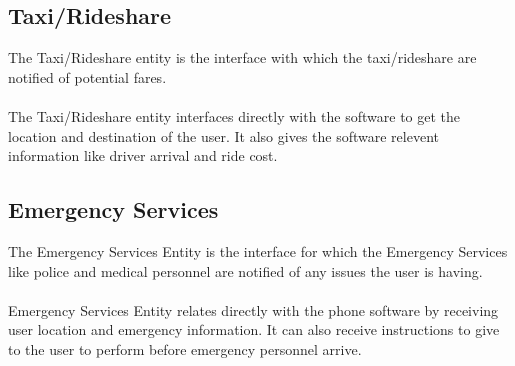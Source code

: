 \documentclass[12pt]{article}
\begin{document}
\begin{multicols}{2}
\subsection*{Taxi/Rideshare}
The Taxi/Rideshare entity is the interface with which the taxi/rideshare are notified of potential fares.\\
\\
The Taxi/Rideshare entity interfaces directly with the software to get the location and destination of the user.  It also gives the software relevent information like driver arrival and ride cost.

\subsection*{Emergency Services}
The Emergency Services Entity is the interface for which the Emergency Services like police and medical personnel are notified of any issues the user is having.\\
\\
Emergency Services Entity relates directly with the phone software by receiving user location and emergency information.  It can also receive instructions to give to the user to perform before emergency personnel arrive.

\end{multicols}
\end{document}
